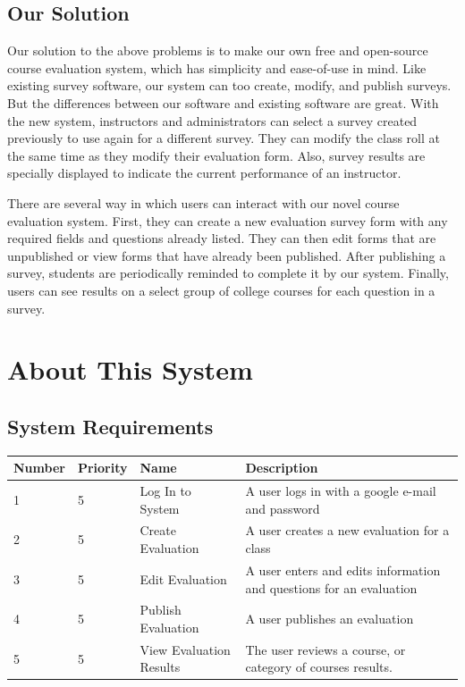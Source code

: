 \documentclass{article}
\begin{document}
\subsection{Our Solution}

Our solution to the above problems is to make our own free and open-source course evaluation system, which has simplicity and ease-of-use in mind. Like existing survey software, our system can too create, modify, and publish surveys. But the differences between our software and existing software are great. With the new system, instructors and administrators can select a survey created previously to use again for a different survey. They can modify the class roll at the same time as they modify their evaluation form. Also, survey results are specially displayed to indicate the current performance of an instructor.

There are several way in which users can interact with our novel course evaluation system. First, they can create a new evaluation survey form with any required fields and questions already listed. They can then edit forms that are unpublished or view forms that have already been published. After publishing a survey, students are periodically reminded to complete it by our system. Finally, users can see results on a select group of college courses for each question in a survey.

\newpage

\section{About This System}

\subsection{System Requirements}

\begin{center}
\begin{tabular}{|p{1.5cm}|p{1.5cm}|p{3.5cm}|p{6cm}|} 
\hline
\textbf{Number} & \textbf{Priority} & \textbf{Name} & \textbf{Description} \\
\hline
1 & 5 & Log In to System & A user logs in with a google e-mail and password \\ 
\hline
2 & 5 & Create Evaluation & A user creates a new evaluation for a class \\ 
\hline
3 & 5 & Edit Evaluation & A user enters and edits information and questions for an evaluation \\  
\hline
4 & 5 & Publish Evaluation & A user publishes an evaluation \\
\hline
5 & 5 & View Evaluation Results & The user reviews a course, or category of courses results. \\ 
\hline

\end{tabular}
\end{center}
\end{document}
